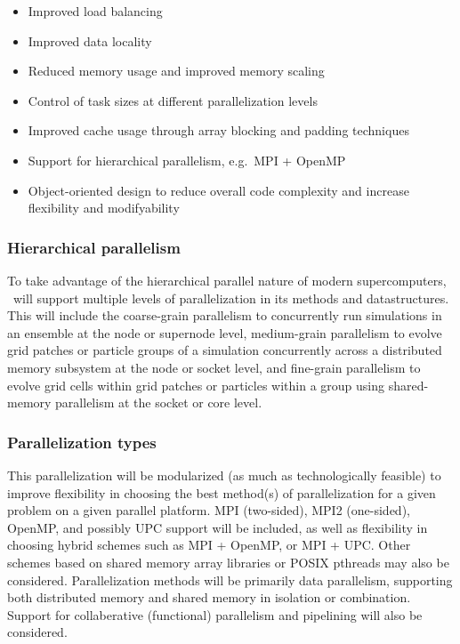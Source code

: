 \documentclass{article}
\begin{document}
    \begin{itemize}
    \item Improved load balancing
    \item Improved data locality
    \item Reduced memory usage and improved memory scaling
    \item Control of task sizes at different parallelization levels
    \item Improved cache usage through array blocking and padding techniques
    \item Support for hierarchical parallelism, e.g.~MPI + OpenMP
    \item Object-oriented design to reduce overall code complexity and 
          increase flexibility and modifyability
    \end{itemize}

    \subsubsection{Hierarchical parallelism} 

    To take advantage of the hierarchical parallel nature of modern
    supercomputers, \cello\ will support multiple levels of
    parallelization in its methods and datastructures.  This will
    include the coarse-grain parallelism to concurrently run
    simulations in an ensemble at the node or supernode level,
    medium-grain parallelism to evolve grid patches or particle groups
    of a simulation concurrently across a distributed memory subsystem
    at the node or socket level, and fine-grain parallelism to evolve
    grid cells within grid patches or particles within a group using
    shared-memory parallelism at the socket or core level.

    \subsubsection{Parallelization types}  

    This parallelization will be modularized (as much as
    technologically feasible) to improve flexibility in choosing the
    best method(s) of parallelization for a given problem on a given
    parallel platform.  MPI (two-sided), MPI2 (one-sided), OpenMP, and
    possibly UPC support will be included, as well as flexibility in
    choosing hybrid schemes such as MPI + OpenMP, or MPI + UPC.  Other
    schemes based on shared memory array libraries or POSIX pthreads
    may also be considered.  Parallelization methods will be primarily
    data parallelism, supporting both distributed memory and shared
    memory in isolation or combination.  Support for collaberative
    (functional) parallelism and pipelining will also be considered.
\end{document}
